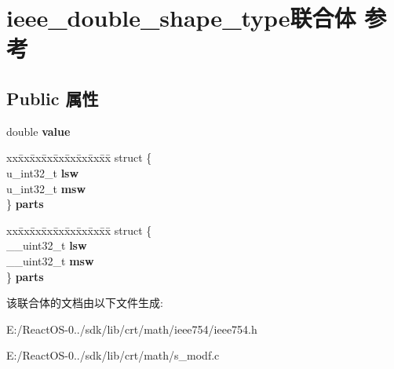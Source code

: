 \hypertarget{unionieee__double__shape__type}{}\section{ieee\+\_\+double\+\_\+shape\+\_\+type联合体 参考}
\label{unionieee__double__shape__type}
\subsection*{Public 属性}
\begin{DoxyCompactItemize}
\item 
\mbox{\label{unionieee__double__shape__type_a2d9c4cab9e3fa74e4be6d72f798a145b}} 
double {\bfseries value}
\item 
\mbox{\label{unionieee__double__shape__type_aaf2e753a3bbadf436961d51f1531c2e1}} 
\begin{tabbing}
xx\=xx\=xx\=xx\=xx\=xx\=xx\=xx\=xx\=\kill
struct \{\\
\>u\_int32\_t {\bfseries lsw}\\
\>u\_int32\_t {\bfseries msw}\\
\} {\bfseries parts}\\

\end{tabbing}\item 
\mbox{\label{unionieee__double__shape__type_a61e90c5c02ce8204fac8fcec355bdf23}} 
\begin{tabbing}
xx\=xx\=xx\=xx\=xx\=xx\=xx\=xx\=xx\=\kill
struct \{\\
\>\_\_uint32\_t {\bfseries lsw}\\
\>\_\_uint32\_t {\bfseries msw}\\
\} {\bfseries parts}\\

\end{tabbing}\end{DoxyCompactItemize}


该联合体的文档由以下文件生成\+:\begin{DoxyCompactItemize}
\item 
E\+:/\+React\+O\+S-\/0../sdk/lib/crt/math/ieee754/ieee754.\+h\item 
E\+:/\+React\+O\+S-\/0../sdk/lib/crt/math/s\+\_\+modf.\+c\end{DoxyCompactItemize}
